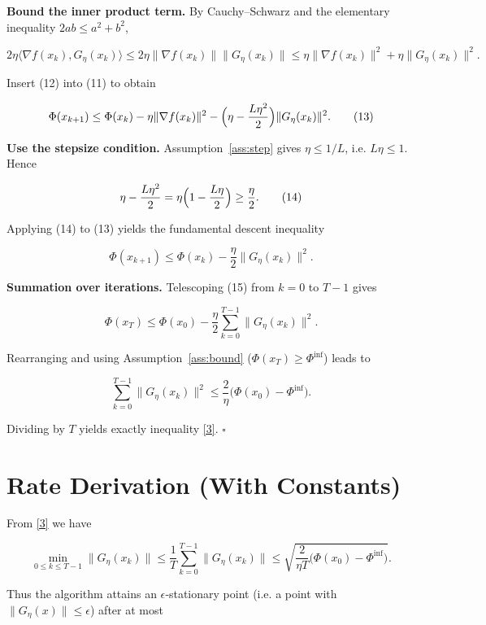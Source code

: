 \documentclass{article}
\newcommand{\grad}{\nabla}
\begin{document}
\begin{enumerate}[label={[\textbf{Step \arabic*}]}, leftmargin=*, nosep]
\item \textbf{Bound the inner product term.}  
By Cauchy–Schwarz and the elementary inequality $2ab\le a^{2}+b^{2}$,

\[
2\eta\langle\grad f(x_{k}),G_{\eta}(x_{k})\rangle
\le 2\eta\|\grad f(x_{k})\|\|G_{\eta}(x_{k})\|
\le \eta\|\grad f(x_{k})\|^{2}
   +\eta\|G_{\eta}(x_{k})\|^{2}. \tag{12}
\]

Insert (12) into (11) to obtain  

\[
\Phi(x_{k+1})\le \Phi(x_{k})
   -\eta\|\grad f(x_{k})\|^{2}
   -\Bigl(\eta-\frac{L\eta^{2}}{2}\Bigr)\|G_{\eta}(x_{k})\|^{2}. \tag{13}
\]

\item \textbf{Use the stepsize condition.}  
Assumption~\ref{ass:step} gives $\eta\le 1/L$, i.e. $L\eta\le1$. Hence  

\[
\eta-\frac{L\eta^{2}}{2}
   =\eta\Bigl(1-\frac{L\eta}{2}\Bigr)
   \ge \frac{\eta}{2}. \tag{14}
\]

Applying (14) to (13) yields the fundamental descent inequality  

\[
\Phi(x_{k+1})\le \Phi(x_{k})-\frac{\eta}{2}\|G_{\eta}(x_{k})\|^{2}. \tag{15}
\]

\item \textbf{Summation over iterations.}  
Telescoping (15) from $k=0$ to $T-1$ gives  

\[
\Phi(x_{T})\le \Phi(x_{0})-\frac{\eta}{2}\sum_{k=0}^{T-1}\|G_{\eta}(x_{k})\|^{2}. \tag{16}
\]

Rearranging and using Assumption~\ref{ass:bound} ($\Phi(x_{T})\ge\Phi^{\inf}$) leads to  

\[
\sum_{k=0}^{T-1}\|G_{\eta}(x_{k})\|^{2}
\le \frac{2}{\eta}\bigl(\Phi(x_{0})-\Phi^{\inf}\bigr). \tag{17}
\]

Dividing by $T$ yields exactly inequality \eqref{3}. \hfill $\square$
\end{enumerate}

\section*{Rate Derivation (With Constants)}
From \eqref{3} we have  

\[
\min_{0\le k\le T-1}\|G_{\eta}(x_{k})\|
\le\frac{1}{T}\sum_{k=0}^{T-1}\|G_{\eta}(x_{k})\|
\le\sqrt{\frac{2}{\eta T}\bigl(\Phi(x_{0})-\Phi^{\inf}\bigr)}.
\]

Thus the algorithm attains an $\epsilon$‑stationary point (i.e. a point with $\|G_{\eta}(x)\|\le\epsilon$) after at most  
\end{document}
